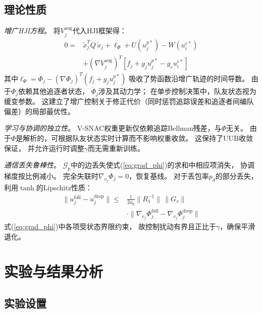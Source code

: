 \documentclass[conference]{IEEEtran}
\begin{document}
\subsection{理论性质}

\textit{增广HJI方程}。
将$V_j^{\mathrm{aug}}$代入HJI框架得：
\begin{equation}\label{eq:aug_hji}
\begin{split}
0 ={} & \tilde{x}_j^T Q\,\tilde{x}_j + \ell_\Phi + U(u_j^{p*}) - W(u_i^{e*}) \\
& + (\nabla V_j^{\mathrm{aug}})^T [f_j + g_j u_j^{p*} - g_e u_i^{e*}]
\end{split}
\end{equation}
其中$\ell_\Phi = \dot{\Phi}_j - (\nabla \Phi_j)^T(f_j + g_j u_j^{p*})$
吸收了势函数沿增广轨迹的时间导数。
由于$\Phi_j$依赖其他追逐者状态，
$\dot{\Phi}_j$涉及其动力学；
在单步控制决策中，队友状态视为缓变参数。
这建立了增广控制关于修正代价（同时惩罚追踪误差和追逐者间编队偏差）的局部最优性。

\textit{学习与协调的独立性}。
V-SNAC权重更新仅依赖追踪Bellman残差，与$\Phi$无关。
由于$\Phi$是解析的，可根据队友状态实时计算而不影响权重收敛。
这保持了UUB收敛保证\cite{b_lewis1998}，
并允许运行时调整$\gamma$而无需重新训练。

\textit{通信丢失鲁棒性}。
$\mathcal{G}_p$中的边丢失使式(\ref{eq:grad_phi})的求和中相应项消失，
协调梯度按比例减小。
完全失联时$\nabla_{v_j}\Phi_j = 0$，恢复基线。
对于丢包率$p_d$的部分丢失，利用$\tanh$的Lipschitz性质：
\begin{equation}\label{eq:dropout}
\begin{split}
\|u_j^{\text{full}} - u_j^{\text{drop}}\| \leq {} & \frac{1}{2\bar{u}_p}\|R_1^{-1}\|\,\|G_v\| \\
& \cdot \|\nabla_{v_j}\Phi_j^{\text{full}} - \nabla_{v_j}\Phi_j^{\text{drop}}\|
\end{split}
\end{equation}
式(\ref{eq:grad_phi})中各项受状态界限约束，
故控制扰动有界且正比于$\gamma$，确保平滑退化。


\section{实验与结果分析}

\subsection{实验设置}
\end{document}
